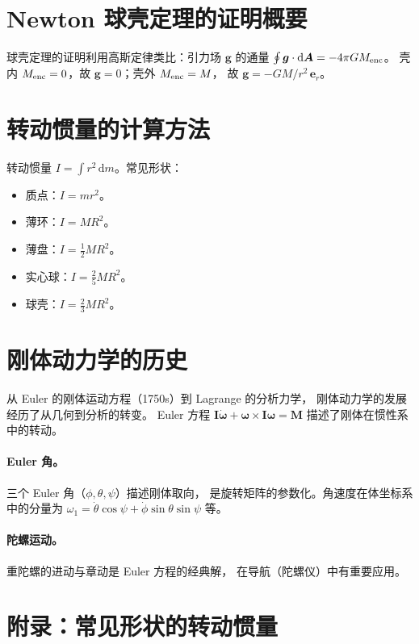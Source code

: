 \documentclass[UTF8,a4paper,11pt]{ctexart}
\begin{document}
\section{Newton 球壳定理的证明概要}
\label{sec:shell-proof}

球壳定理的证明利用高斯定律类比：引力场 $\boldsymbol g$ 的通量
$\oint \boldsymbol g\cdot\mathrm d\boldsymbol A=-4\pi GM_{\rm enc}$。
壳内 $M_{\rm enc}=0$，故 $\boldsymbol g=0$；壳外 $M_{\rm enc}=M$，
故 $\boldsymbol g=-GM/r^2\,\boldsymbol e_r$。

\section{转动惯量的计算方法}
\label{sec:moment-inertia}

转动惯量 $I=\int r^2\,\mathrm dm$。常见形状：
\begin{itemize}
  \item 质点：$I=mr^2$。
  \item 薄环：$I=MR^2$。
  \item 薄盘：$I=\frac12 MR^2$。
  \item 实心球：$I=\frac25 MR^2$。
  \item 球壳：$I=\frac23 MR^2$。
\end{itemize}

\section{刚体动力学的历史}
\label{sec:history-rigid}

从 Euler 的刚体运动方程（1750s）到 Lagrange 的分析力学，
刚体动力学的发展经历了从几何到分析的转变。
Euler 方程 $\boldsymbol I\dot{\boldsymbol\omega}+\boldsymbol\omega\times\boldsymbol I\boldsymbol\omega=\boldsymbol M$
描述了刚体在惯性系中的转动。

\paragraph{Euler 角。}
三个 Euler 角（$\phi,\theta,\psi$）描述刚体取向，
是旋转矩阵的参数化。角速度在体坐标系中的分量为
$\omega_1=\dot\theta\cos\psi+\dot\phi\sin\theta\sin\psi$ 等。

\paragraph{陀螺运动。}
重陀螺的进动与章动是 Euler 方程的经典解，
在导航（陀螺仪）中有重要应用。

\section{附录：常见形状的转动惯量}
\label{sec:appendix-inertia}
\end{document}
